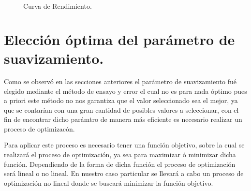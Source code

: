 \begin{figure}[h]
\caption{Curva de Rendimiento.}
\end{figure}



\section{Elecci\'on \'optima del par\'ametro de suavizamiento.}

\hspace{0.4cm} Como se observ\'o en las secciones anteriores el par\'ametro de suavizamiento fu\'e elegido mediante el m\'etodo de ensayo y error el cual no es para nada \'optimo pues a priori este m\'etodo no nos garantiza que el valor seleccionado sea el mejor, ya que se contar\'ian con una gran cantidad de posibles valores a seleccionar, con el fin  de encontrar dicho par\'amtro de manera m\'as eficiente es necesario realizar un proceso de optimizac\'on.


\hspace{0.4cm} Para aplicar este proceso es necesario tener una funci\'on objetivo, sobre la cual se realizar\'a el proceso de optimizaci\'on, ya sea para maximizar \'o minimizar dicha funci\'on. Dependiendo de la forma de dicha funci\'on el proceso de optimizaci\'on ser\'a lineal o no lineal. En nuestro caso particular se llevar\'a a cabo un proceso de optimizaci\'on no lineal donde se buscar\'a minimizar la funci\'on objetivo.

\vspace{0.5cm}

